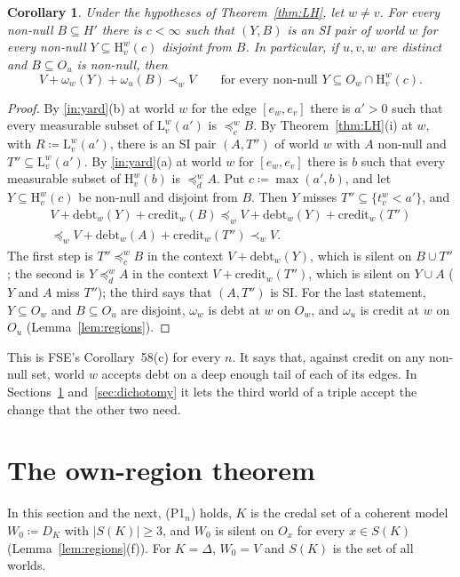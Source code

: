 \documentclass[11pt]{article}
\newtheorem{corollary}[theorem]{Corollary}
\theoremstyle{definition}\newtheorem{definition}[theorem]{Definition}
\theoremstyle{remark}\newtheorem{remark}[theorem]{Remark}
\newcommand{\debt}{\mathrm{debt}}
\newcommand{\cred}{\mathrm{credit}}
\newcommand{\Lo}[3]{\mathrm L^{#1}_{#2}(#3)}
\newcommand{\Hi}[3]{\mathrm H^{#1}_{#2}(#3)}
\begin{document}
\begin{corollary}\label{cor:accept}
Under the hypotheses of Theorem~\ref{thm:LH}, let $w\ne v$. For every
non-null $B\subseteq H'$ there is $c<\infty$ such that $(Y,B)$ is an SI
pair of world $w$ for every non-null $Y\subseteq\Hi wvc$ disjoint from $B$.
In particular, if $u,v,w$ are distinct and $B\subseteq O_u$ is non-null,
then
\[
 V+\omega_w(Y)+\omega_u(B)\prec_wV\qquad\text{for every non-null }
 Y\subseteq O_w\cap\Hi wvc.
\]
\end{corollary}
\begin{proof}
By \ref{in:yard}(b) at world $w$ for the edge $[e_w,e_v]$ there is $a'>0$
such that every measurable subset of $\Lo wv{a'}$ is $\preceq^w_cB$. By
Theorem~\ref{thm:LH}(i) at $w$, with $R\coloneqq\Lo wv{a'}$, there is an SI
pair $(A,T'')$ of world $w$ with $A$ non-null and $T''\subseteq\Lo
wv{a'}$. By \ref{in:yard}(a) at world $w$ for $[e_w,e_v]$ there is $b$ such
that every measurable subset of $\Hi wvb$ is $\preceq^w_dA$. Put
$c\coloneqq\max(a',b)$, and let $Y\subseteq\Hi wvc$ be non-null and
disjoint from $B$. Then $Y$ misses $T''\subseteq\{t^w_v<a'\}$, and
\begin{multline*}
 V+\debt_w(Y)+\cred_w(B)\preceq_wV+\debt_w(Y)+\cred_w(T'')\\
 \preceq_wV+\debt_w(A)+\cred_w(T'')\prec_wV.
\end{multline*}
The first step is $T''\preceq^w_cB$ in the context $V+\debt_w(Y)$, which is
silent on $B\cup T''$; the second is $Y\preceq^w_dA$ in the context
$V+\cred_w(T'')$, which is silent on $Y\cup A$ ($Y$ and $A$ miss $T''$);
the third says that $(A,T'')$ is SI. For the last statement, $Y\subseteq
O_w$ and $B\subseteq O_u$ are disjoint, $\omega_w$ is debt at $w$ on $O_w$,
and $\omega_u$ is credit at $w$ on $O_u$ (Lemma~\ref{lem:regions}).
\end{proof}

This is FSE's Corollary~58(c) for every $n$. It says that, against credit
on any non-null set, world $w$ accepts debt on a deep enough tail of each
of its edges. In Sections~\ref{sec:own} and~\ref{sec:dichotomy} it lets the
third world of a triple accept the change that the other two need.

\section{The own-region theorem}\label{sec:own}

In this section and the next, (P1$_n$) holds, $K$ is the credal set of a
coherent model $W_0\coloneqq D_K$ with $|S(K)|\ge3$, and $W_0$ is silent on
$O_x$ for every $x\in S(K)$ (Lemma~\ref{lem:regions}(f)). For $K=\Delta$,
$W_0=V$ and $S(K)$ is the set of all worlds.
\end{document}
